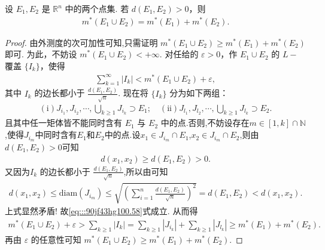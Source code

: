 \documentclass[../../main.tex]{subfiles}%
\begin{document}
\begin{theorem}\label{theorem:距离大于零的两个点集的外测度满足可数可加性}
设 \(E_1, E_2\) 是 \(\mathbb{R}^n\) 中的两个点集. 若 \(d(E_1, E_2)>0\)，则
\begin{align*}
m^*(E_1 \cup E_2) = m^*(E_1) + m^*(E_2).
\end{align*}
\end{theorem}
\begin{proof}

由外测度的次可加性可知,只需证明 \(m^*(E_1 \cup E_2) \geqslant  m^*(E_1) + m^*(E_2)\) 即可. 为此，不妨设 \(m^*(E_1 \cup E_2)< + \infty\). 对任给的 \(\varepsilon > 0\)，作 \(E_1 \cup E_2\) 的 \(L -\)覆盖 \(\{I_k\}\)，使得
\begin{align*}
\sum_{k = 1}^{\infty} |I_k| < m^*(E_1 \cup E_2) + \varepsilon,
\end{align*}
其中 \(I_k\) 的边长都小于 \(\frac{d\left( E_1,E_2 \right)}{\sqrt{n}}\). 现在将 \(\{I_k\}\) 分为如下两组：
\begin{align}
(\text{i})J_{i_1}, J_{i_2}, \cdots,\bigcup_{k \geqslant  1} J_{i_k} \supset E_1 ; \quad (\text{ii})J_{l_1}, J_{l_2}, \cdots,\bigcup_{k \geqslant  1} J_{l_k} \supset E_2.\label{eq:::90jf43hg100.58}
\end{align}
且其中任一矩体皆不能同时含有 \(E_1\) 与 \(E_2\) 中的点.否则,不妨设存在$m\in [1,k]\cap \mathbb{N}$,使得$J_{i_m}$中同时含有$E_1$和$E_2$中的点.设$x_1\in J_{i_m}\cap E_1$,$x_2\in J_{i_m}\cap E_2$,则由$d(E_1,E_2)>0$可知
\begin{align*}
d(x_1,x_2) \geqslant d(E_1,E_2) > 0.
\end{align*}
又因为\(I_k\) 的边长都小于 \(\frac{d\left( E_1,E_2 \right)}{\sqrt{n}}\),所以由可知
\begin{align*}
d(x_1,x_2)\leqslant \mathrm{diam}\left( J_{i_m} \right) \leqslant \sqrt{\left( \sum_{i=1}^n{\frac{d\left( E_1,E_2 \right)}{\sqrt{n}}} \right) ^2}=d(E_1,E_2)<d(x_1,x_2).
\end{align*}
上式显然矛盾!
故\eqref{eq:::90jf43hg100.58}式成立.
从而得
\begin{align*}
m^*(E_1 \cup E_2) + \varepsilon > \sum_{k \geqslant  1} |I_k| = \sum_{k \geqslant  1} |J_{i_k}| + \sum_{k \geqslant  1} |J_{l_k}| \geqslant  m^*(E_1) + m^*(E_2).
\end{align*}
再由 \(\varepsilon\) 的任意性可知 \(m^*(E_1 \cup E_2) \geqslant  m^*(E_1) + m^*(E_2)\). 

\end{proof}
\end{document}
